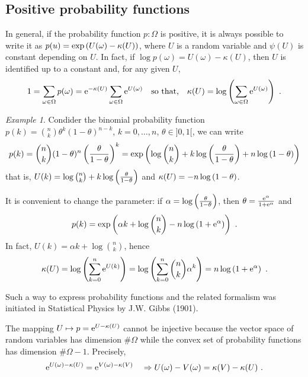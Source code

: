\documentclass[12pt,a4paper]{amsart}
\theoremstyle{plain}%
\theoremstyle{definition}
\theoremstyle{remark}
\newtheorem{example}{Example}
\begin{document}
\subsection{Positive probability functions} In general, if the probability function $p : \Omega$ is positive, it is always possible to write it as $p(u) = \exp\left(U(\omega) - \kappa(U)\right)$, where $U$ is a random variable and $\psi(U)$ is constant depending on $U$. In fact, if $\log p(\omega) = U(\omega) - \kappa(U)$, then $U$ is identified up to a constant and, for any given $U$,
  \begin{equation*}
    1 = \sum_{\omega \in \Omega} p(\omega) = \mathrm{e}^{-\kappa(U)} \sum_{\omega\in\Omega} \mathrm{e}^{U(\omega)} \quad \text{so that,} \quad \kappa(U) = \log\left(\sum_{\omega\in\Omega} \mathrm{e}^{U(\omega)}\right) \ .
  \end{equation*}

  \begin{example}
  Condider the binomial probability function $p(k) = \binom n k \theta^k (1-\theta)^{n-k}$, $k = 0,\dots, n$, $\theta \in ]0,1[$, we can write
  \begin{equation*}
    p(k) = \binom n k (1-\theta)^n \left(\frac \theta {1-\theta}\right)^k = \exp\left(\log \binom n k + k \log\left(\frac \theta {1-\theta}\right) + n \log\left(1-\theta\right)\right)
  \end{equation*}
  that is, $U(k) = \log \binom n k + k \log\left(\frac \theta {1-\theta}\right)$ and $\kappa(U) = - n \log\left(1-\theta\right)$. 

  It is convenient to change the parameter: if $\alpha = \log\left(\frac \theta {1-\theta}\right)$, then $\theta = \frac{\mathrm{e}^\alpha}{1+\mathrm{e}^\alpha}$ and
  \begin{equation*}
  p(k) = \exp\left(\alpha k + \log\binom n k - n \log\left(1+\mathrm{e}^\alpha\right)\right) \ .  
\end{equation*}
In fact, $U(k) = \alpha k + \log \binom n k$, hence
\begin{equation*}
  \kappa(U) = \log\left(\sum_{k=0}^n \mathrm{e}^{U(k)}\right) = \log\left(\sum_{k=0}^n \binom n k \alpha^k\right) = n \log\left(1+\mathrm{e}^\alpha\right) \ .
\end{equation*}
\end{example}

Such a way to express probability functions and the related formalism was initiated in Statistical Physics by J.W. Gibbs (1901).

The mapping $U \mapsto p = \mathrm{e}^{U - \kappa(U)}$ cannot be injective because the vector space of random variables has dimension $\#\Omega$ while the convex set of probability functions has dimension $\#\Omega - 1$. Precisely,
\begin{equation*}
  \mathrm{e}^{U(\omega)-\kappa(U)} = \mathrm{e}^{V(\omega) - \kappa(V)} \quad \Rightarrow U(\omega)-V(\omega) = \kappa(V) - \kappa(U) \ .
\end{equation*}
\end{document}
